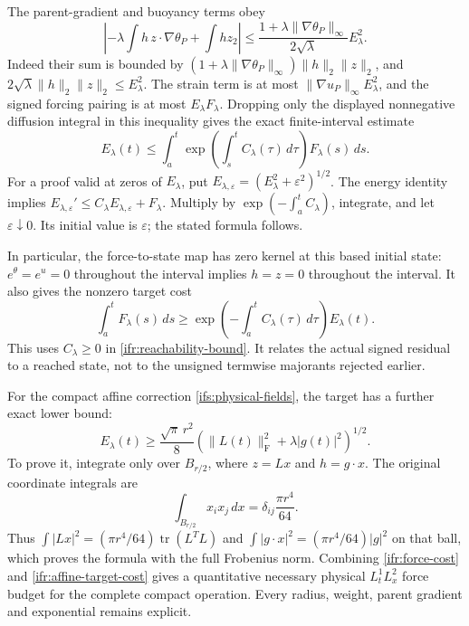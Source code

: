 The parent-gradient and buoyancy terms obey
\[
 \left|-\lambda\int h\,z\cdot\nabla\theta_P+\int h z_2\right|
 \leq\frac{1+\lambda\|\nabla\theta_P\|_\infty}
             {2\sqrt\lambda}E_\lambda^2.
\]
Indeed their sum is bounded by
$(1+\lambda\|\nabla\theta_P\|_\infty)\|h\|_2\|z\|_2$,
and $2\sqrt\lambda\|h\|_2\|z\|_2\leq E_\lambda^2$.
The strain term is at most
$\|\nabla u_P\|_\infty E_\lambda^2$, and the signed forcing
pairing is at most $E_\lambda F_\lambda$.
Dropping only the displayed nonnegative diffusion integral in this
inequality gives the exact finite-interval estimate
\begin{equation}\label{ifr:reachability-bound}
 E_\lambda(t)\leq
 \int_a^t
   \exp\!\left(\int_s^t C_\lambda(\tau)\,d\tau\right)
       F_\lambda(s)\,ds .
\end{equation}
For a proof valid at zeros of $E_\lambda$, put
$E_{\lambda,\varepsilon}=(E_\lambda^2+\varepsilon^2)^{1/2}$.
The energy identity implies
$E_{\lambda,\varepsilon}'\leq
C_\lambda E_{\lambda,\varepsilon}+F_\lambda$.
Multiply by $\exp(-\int_a^t C_\lambda)$, integrate, and let
$\varepsilon\downarrow0$.  Its initial value is $\varepsilon$;
the stated formula follows.

In particular, the force-to-state map has zero kernel at this based
initial state: $e^\theta=e^u=0$ throughout the interval implies
$h=z=0$ throughout the interval.  It also gives the nonzero target cost
\begin{equation}\label{ifr:force-cost}
 \int_a^t F_\lambda(s)\,ds
 \geq
 \exp\!\left(-\int_a^t C_\lambda(\tau)\,d\tau\right)E_\lambda(t).
\end{equation}
This uses $C_\lambda\geq0$ in \eqref{ifr:reachability-bound}.
It relates the actual signed residual to a reached state, not to the
unsigned termwise majorants rejected earlier.

For the compact affine correction \eqref{ifs:physical-fields},
the target has a further exact lower bound:
\begin{equation}\label{ifr:affine-target-cost}
 E_\lambda(t)\geq
 \frac{\sqrt\pi\,r^2}{8}
 \left(\|L(t)\|_{\mathrm F}^2+\lambda|g(t)|^2\right)^{1/2}.
\end{equation}
To prove it, integrate only over $B_{r/2}$, where
$z=Lx$ and $h=g\cdot x$.  The original coordinate integrals are
\[
 \int_{B_{r/2}}x_i x_j\,dx
    =\delta_{ij}\frac{\pi r^4}{64}.
\]
Thus $\int|Lx|^2=(\pi r^4/64)\operatorname{tr}(L^TL)$
and $\int|g\cdot x|^2=(\pi r^4/64)|g|^2$ on that ball,
which proves the formula with the full Frobenius norm.
Combining \eqref{ifr:force-cost} and
\eqref{ifr:affine-target-cost} gives a quantitative necessary
physical $L^1_tL^2_x$ force budget for the complete compact operation.
Every radius, weight, parent gradient and exponential remains explicit.

